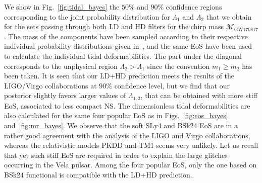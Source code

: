 We show in Fig.~\ref{fig:tidal_bayes} the $50\%$ and $90\%$ confidence
regions corresponding to the joint probability distribution for $\Lambda_1$ 
and $\Lambda_2$ that we obtain for the sets passing through both LD and HD 
filters for the chirp mass $\mathcal{M}_\text{GW170817}$. The mass of the 
components have been sampled according to their respective individual 
probability distributions given in~\cite{GWtidal}, and the same EoS have been 
used to calculate the individual tidal deformabilities. The part under
the diagonal corresponds to the unphysical region $\Lambda_2 > \Lambda_1$ since 
the convention $m_1 \geq m_2$ has been taken. It is seen that our 
LD+HD prediction meets the results of the LIGO/Virgo collaborations at 
$90\%$ confidence level, but we find that our posterior slightly favors larger 
values of $\Lambda_{1,2}$, that can be obtained with more stiff EoS, associated 
to less compact NS. 
The dimensionless tidal deformabilities are also calculated for the same four 
popular EoS as in Figs.~\ref{fig:eos_bayes} and~\ref{fig:mr_bayes}.
We observe that the soft SLy4 and BSk24 EoS are in a rather good agreement with 
the analysis of the LIGO and Virgo collaborations, whereas the relativistic
models PKDD and TM1 seems very unlikely. Let us recall that yet such stiff EoS
are required in order to explain the large glitches occurring in the Vela
pulsar. Among the four popular EoS, only the one based on BSk24 functional is
compatible with the LD+HD prediction.


